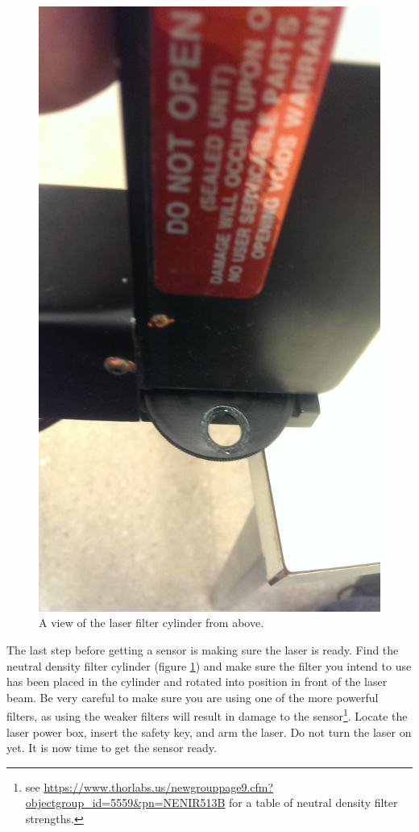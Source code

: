 \documentclass{report}
\begin{document}
            \begin{figure}[h] 
                \includegraphics[height=.4\textheight]{laser_00}
                \centering
                \caption{ A view of the laser filter cylinder from above. }
                \label{fig:laser_00}
            \end{figure}

            The last step before getting a sensor is making sure the laser is ready. Find the neutral density filter cylinder (figure \ref{fig:laser_00}) and make sure the filter you intend to use has been placed in the cylinder and rotated into position in front of the laser beam. Be very careful to make sure you are using one of the more powerful filters, as using the weaker filters will result in damage to the sensor\footnote{see \url{https://www.thorlabs.us/newgrouppage9.cfm?objectgroup\_id=5559&pn=NENIR513B} for a table of neutral density filter strengths.}. Locate the laser power box, insert the safety key, and arm the laser. Do not turn the laser on yet. It is now time to get the sensor ready.
\end{document}
